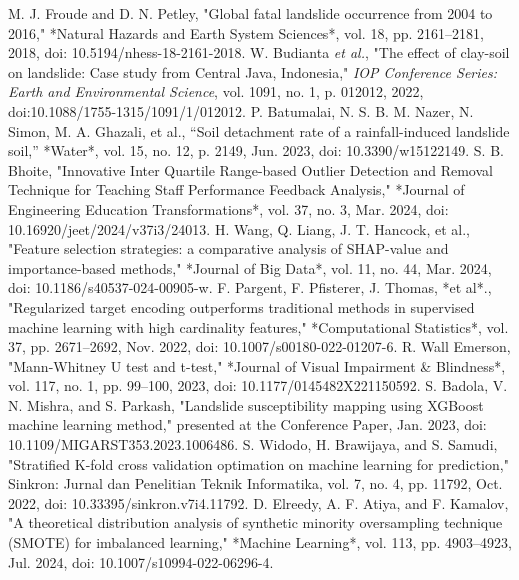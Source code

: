 \documentclass[conference]{IEEEtran}
\begin{document}







\begin{thebibliography}{00} 
 M. J. Froude and D. N. Petley, "Global fatal landslide occurrence from 2004 to 2016," *Natural Hazards and Earth System Sciences*, vol. 18, pp. 2161–2181, 2018, doi: 10.5194/nhess-18-2161-2018.
 W. Budianta \emph{et al.}, "The effect of clay-soil on landslide: Case study from Central Java, Indonesia," \emph{IOP Conference Series: Earth and Environmental Science}, vol. 1091, no. 1, p. 012012, 2022, doi:10.1088/1755-1315/1091/1/012012.
 P. Batumalai, N. S. B. M. Nazer, N. Simon, M. A. Ghazali, et al., “Soil detachment rate of a rainfall-induced landslide soil,” *Water*, vol. 15, no. 12, p. 2149, Jun. 2023, doi: 10.3390/w15122149.
 S. B. Bhoite, "Innovative Inter Quartile Range-based Outlier Detection and Removal Technique for Teaching Staff Performance Feedback Analysis," *Journal of Engineering Education Transformations*, vol. 37, no. 3, Mar. 2024, doi: 10.16920/jeet/2024/v37i3/24013.
 H. Wang, Q. Liang, J. T. Hancock, et al., "Feature selection strategies: a comparative analysis of SHAP-value and importance-based methods," *Journal of Big Data*, vol. 11, no. 44, Mar. 2024, doi: 10.1186/s40537-024-00905-w.
 F. Pargent, F. Pfisterer, J. Thomas, *et al*., "Regularized target encoding outperforms traditional methods in supervised machine learning with high cardinality features," *Computational Statistics*, vol. 37, pp. 2671–2692, Nov. 2022, doi: 10.1007/s00180-022-01207-6.
 R. Wall Emerson, "Mann-Whitney U test and t-test," *Journal of Visual Impairment \& Blindness*, vol. 117, no. 1, pp. 99–100, 2023, doi: 10.1177/0145482X221150592.
 S. Badola, V. N. Mishra, and S. Parkash, "Landslide susceptibility mapping using XGBoost machine learning method," presented at the Conference Paper, Jan. 2023, doi: 10.1109/MIGARST353.2023.1006486.
 S. Widodo, H. Brawijaya, and S. Samudi, "Stratified K-fold cross validation optimation on machine learning for prediction," Sinkron: Jurnal dan Penelitian Teknik Informatika, vol. 7, no. 4, pp. 11792, Oct. 2022, doi: 10.33395/sinkron.v7i4.11792.
 D. Elreedy, A. F. Atiya, and F. Kamalov, "A theoretical distribution analysis of synthetic minority oversampling technique (SMOTE) for imbalanced learning," *Machine Learning*, vol. 113, pp. 4903–4923, Jul. 2024, doi: 10.1007/s10994-022-06296-4.

\end{thebibliography}
\end{document}
